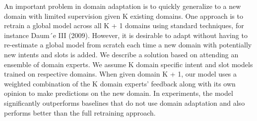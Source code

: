 An important problem in domain adaptation is to quickly generalize to a new domain with limited supervision given K existing domains. One approach is to retrain a global model across all K + 1 domains using standard techniques, for instance Daum´e III (2009). However, it is desirable to adapt without having to re-estimate a global model from scratch each time a new domain with potentially new intents and slots is added. We describe a solution based on attending an ensemble of domain experts. We assume K domain specific intent and slot models trained on respective domains. When given domain K + 1, our model uses a weighted combination of the K domain experts' feedback along with its own opinion to make predictions on the new domain. In experiments, the model significantly outperforms baselines that do not use domain adaptation and also performs better than the full retraining approach.
